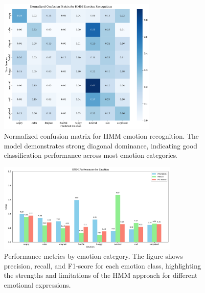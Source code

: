 \begin{figure}[htbp]
    \centering
    \includegraphics[width=0.7\textwidth]{confusion_matrix_norm_20250609_223129.pdf}
    \caption{Normalized confusion matrix for HMM emotion recognition. The model demonstrates strong diagonal dominance, indicating good classification performance across most emotion categories.}
    \label{fig:confusion_matrix}
\end{figure}

\begin{figure}[htbp]
    \centering
    \includegraphics[width=0.8\textwidth]{performance_by_emotion_20250609_223129.pdf}
    \caption{Performance metrics by emotion category. The figure shows precision, recall, and F1-score for each emotion class, highlighting the strengths and limitations of the HMM approach for different emotional expressions.}
    \label{fig:performance_comparison}
\end{figure}
